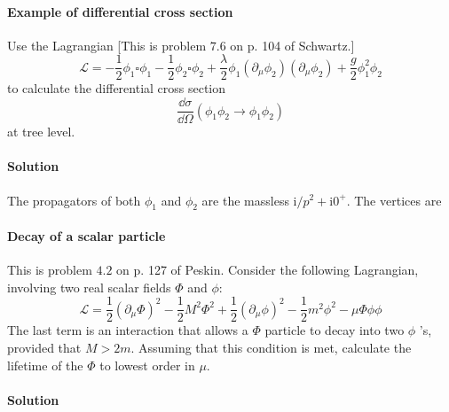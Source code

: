 \documentclass[hyperref, a4paper]{article}
\newcommand*{\ii}{\mathrm{i}}
\begin{document}
\paragraph{}

\paragraph{Example of differential cross section} Use the Lagrangian [This is problem $7.6$ on p. 104 of Schwartz.]
\[
\mathcal{L}=-\frac{1}{2} \phi_{1} \square \phi_{1}-\frac{1}{2} \phi_{2} \square \phi_{2}+\frac{\lambda}{2} \phi_{1}\left(\partial_{\mu} \phi_{2}\right)\left(\partial_{\mu} \phi_{2}\right)+\frac{g}{2} \phi_{1}^{2} \phi_{2}
\]
to calculate the differential cross section
\[
\frac{\dd \sigma}{\dd \Omega}\left(\phi_{1} \phi_{2} \rightarrow \phi_{1} \phi_{2}\right)
\]
at tree level.

\paragraph{Solution} The propagators of both $\phi_1$ and $\phi_2$ are the massless $\ii / p^2 + \ii 0^+$.
The vertices are 


\paragraph{}

\paragraph{Decay of a scalar particle} This is problem $4.2$ on p. 127 of Peskin. Consider the following Lagrangian, involving two real scalar fields $\Phi$ and $\phi$:
\[
\mathcal{L}=\frac{1}{2}\left(\partial_{\mu} \Phi\right)^{2}-\frac{1}{2} M^{2} \Phi^{2}+\frac{1}{2}\left(\partial_{\mu} \phi\right)^{2}-\frac{1}{2} m^{2} \phi^{2}-\mu \Phi \phi \phi
\]
The last term is an interaction that allows a $\Phi$ particle to decay into two $\phi$ 's, provided that $M>2 m$. Assuming that this condition is met, calculate the lifetime of the $\Phi$ to lowest order in $\mu$.

\paragraph{Solution}

\paragraph{}


 
\end{document}
